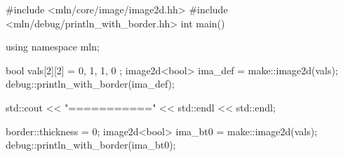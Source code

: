 #include <mln/core/image/image2d.hh>
#include <mln/debug/println_with_border.hh>
int main()
{
  using namespace mln;

  bool vals[2][2] = { {0, 1},
		      {1, 0} };
  image2d<bool> ima_def = make::image2d(vals);
  debug::println_with_border(ima_def);

  std::cout << "===========" << std::endl << std::endl;

  border::thickness = 0;
  image2d<bool> ima_bt0 = make::image2d(vals);
  debug::println_with_border(ima_bt0);
}
